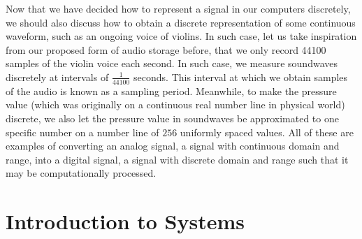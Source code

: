 Now that we have decided how to represent a signal in our computers discretely, we should also discuss how to obtain a discrete representation of some continuous waveform, such as an ongoing voice of violins.
In such case, let us take inspiration from our proposed form of audio storage before, that we only record 44100 samples of the violin voice each second. In such case, we measure soundwaves discretely at intervals of $\frac{1}{44100}$ seconds.
This interval at which we obtain samples of the audio is known as a sampling period.
Meanwhile, to make the pressure value (which was originally on a continuous real number line in physical world) discrete, we also let the pressure value in soundwaves be approximated to one specific number on a number line of $256$ uniformly spaced values.
All of these are examples of converting an analog signal, a signal with continuous domain and range, into a digital signal, a signal with discrete domain and range such that it may be computationally processed.


\section{Introduction to Systems}
